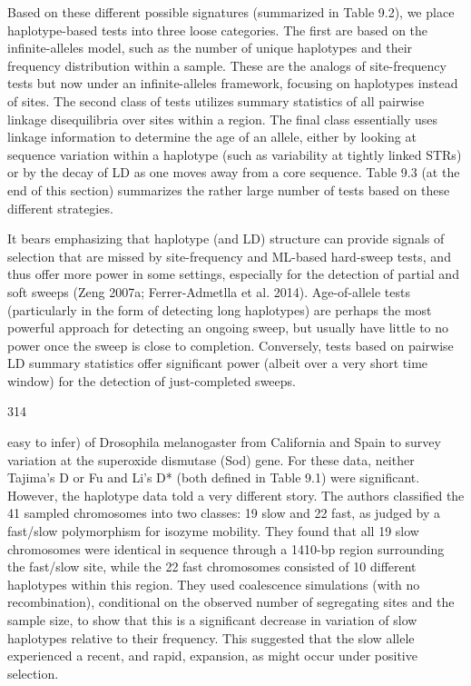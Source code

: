 \documentclass{article}
\begin{document}
Based on these different possible signatures (summarized in Table 9.2), we place haplotype-based tests into three loose categories. The first are based on the infinite-alleles model, such as the number of unique haplotypes and their frequency distribution within a sample. These are the analogs of site-frequency tests but now under an infinite-alleles framework, focusing on haplotypes instead of sites. The second class of tests utilizes summary statistics of all pairwise linkage disequilibria over sites within a region. The final class essentially uses linkage information to determine the age of an allele, either by looking at sequence variation within a haplotype (such as variability at tightly linked STRs) or by the decay of LD as one moves away from a core sequence. Table 9.3 (at the end of this section) summarizes the rather large number of tests based on these different strategies.

It bears emphasizing that haplotype (and LD) structure can provide signals of selection that are missed by site-frequency and ML-based hard-sweep tests, and thus offer more power in some settings, especially for the detection of partial and soft sweeps (Zeng 2007a; Ferrer-Admetlla et al. 2014). Age-of-allele tests (particularly in the form of detecting long haplotypes) are perhaps the most powerful approach for detecting an ongoing sweep, but usually have little to no power once the sweep is close to completion. Conversely, tests based on pairwise LD summary statistics offer significant power (albeit over a very short time window) for the detection of just-completed sweeps.

314

easy to infer) of Drosophila melanogaster from California and Spain to survey variation at the superoxide dismutase (Sod) gene. For these data, neither Tajima's D or Fu and Li's D* (both defined in Table 9.1) were significant. However, the haplotype data told a very different story. The authors classified the 41 sampled chromosomes into two classes: 19 slow and 22 fast, as judged by a fast/slow polymorphism for isozyme mobility. They found that all 19 slow chromosomes were identical in sequence through a 1410-bp region surrounding the fast/slow site, while the 22 fast chromosomes consisted of 10 different haplotypes within this region. They used coalescence simulations (with no recombination), conditional on the observed number of segregating sites and the sample size, to show that this is a significant decrease in variation of slow haplotypes relative to their frequency. This suggested that the slow allele experienced a recent, and rapid, expansion, as might occur under positive selection.
\end{document}
